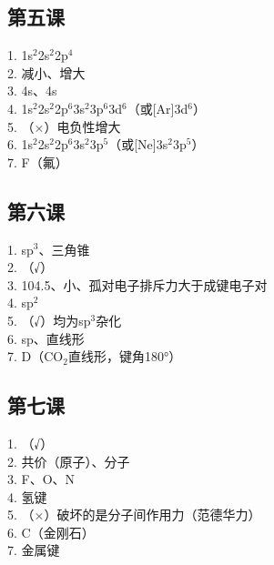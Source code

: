 \documentclass[a4paper,12pt]{ctexart}
\begin{document}
\subsection*{第五课}
1. 1s$^2$2s$^2$2p$^4$\\
2. 减小、增大\\
3. 4s、4s\\
4. 1s$^2$2s$^2$2p$^6$3s$^2$3p$^6$3d$^6$（或[Ar]3d$^6$）\\
5. （×）电负性增大\\
6. 1s$^2$2s$^2$2p$^6$3s$^2$3p$^5$（或[Ne]3s$^2$3p$^5$）\\
7. F（氟）

\subsection*{第六课}
1. sp$^3$、三角锥\\
2. （√）\\
3. 104.5、小、孤对电子排斥力大于成键电子对\\
4. sp$^2$\\
5. （√）均为sp$^3$杂化\\
6. sp、直线形\\
7. D（CO$_2$直线形，键角180°）

\subsection*{第七课}
1. （√）\\
2. 共价（原子）、分子\\
3. F、O、N\\
4. 氢键\\
5. （×）破坏的是分子间作用力（范德华力）\\
6. C（金刚石）\\
7. 金属键
\end{document}
